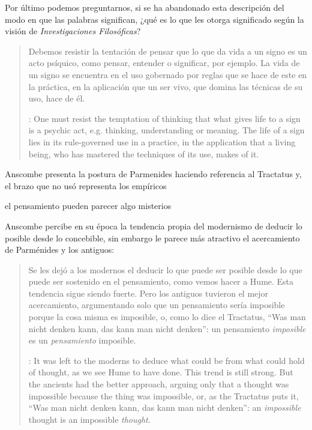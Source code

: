 Por último podemos preguntarnos, si se ha abandonado esta descripción del modo en que las palabras significan, ¿qué es lo que les otorga significado según la visión de \emph{Investigaciones Filosóficas}? \blockquote[{\cite[4]{hacker2000mind}}: One must resist the temptation of thinking that what gives life to a sign is a psychic act, e.g. thinking, understanding or meaning. The life of a sign lies in its rule-governed use in a practice, in the application that a living being, who has mastered the techniques of its use, makes of it.]{Debemos resistir la tentación de pensar que lo que da vida a un signo es un acto psíquico, como pensar, entender o significar, por ejemplo. La vida de un signo se encuentra en el uso gobernado por reglas que se hace de este en la práctica, en la aplicación que un ser vivo, que domina las técnicas de su uso, hace de él.}

Anscombe presenta la postura de Parmenides haciendo referencia al Tractatus y, el brazo que no usó representa los empíricos


el pensamiento pueden parecer algo misterios

Anscombe percibe en su época la tendencia propia del modernismo de deducir lo posible desde lo concebible, sin embargo le parece más atractivo el acercamiento de Parménides y los antiguos: \blockquote[{\cite[xi]{anscombe1981parmenides}}: It was left to the moderns to deduce what could be from what could hold of thought, as we see Hume to have done. This trend is still strong. But the ancients had the better approach, arguing only that a thought was impossible because the thing was impossible, or, as the Tractatus puts it, ``Was man nicht denken kann, das kann man nicht denken'': an \emph{impossible} thought is an impossible \emph{thought}.]{Se les dejó a los modernos el deducir lo que puede ser posible desde lo que puede ser sostenido en el pensamiento, como vemos hacer a Hume. Esta tendencia sigue siendo fuerte. Pero los antiguos tuvieron el mejor acercamiento, argumentando solo que un pensamiento sería imposible porque la cosa misma es imposible, o, como lo dice el Tractatus, ``Was man nicht denken kann, das kann man nicht denken'': un pensamiento \emph{imposible} es un \emph{pensamiento} imposible.}

